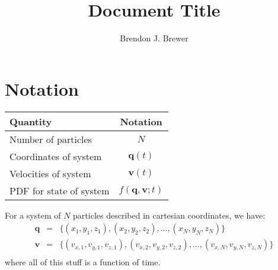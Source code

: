 \documentclass[a4paper, 11pt]{article}
\title{Document Title}
\author{Brendon J. Brewer}
\begin{document}
\maketitle

\section{Notation}

\begin{table}[h!]
\begin{center}
\begin{tabular}{|l|c|}
\hline
{\bf Quantity} & {\bf Notation}\\
\hline
Number of particles & $N$\\
Coordinates of system & $\mathbf{q}(t)$\\
Velocities of system  & $\mathbf{v}(t)$\\
PDF for state of system & $f(\mathbf{q}, \mathbf{v}; t)$\\
\hline
\end{tabular}
\end{center}
\end{table}

For a system of $N$ particles described in cartesian coordinates, we have:
\begin{eqnarray}
\mathbf{q} &=& \{(x_1, y_1, z_1), (x_2, y_2, z_2), ..., (x_N, y_N, z_N)\}\\
\mathbf{v} &=& \{(v_{x,1}, v_{y,1}, v_{z,1}), (v_{x,2}, v_{y,2}, v_{z,2}), ..., (v_{x,N}, v_{y,N}, v_{z,N})\}\\
\end{eqnarray}
where all of this stuff is a function of time.
\end{document}
